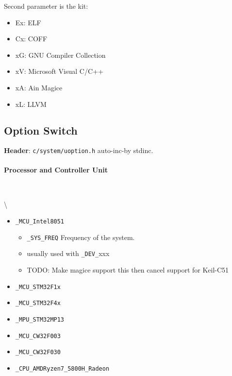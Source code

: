 Second parameter is the kit:

\begin{itemize}

\item Ex: ELF
\item Cx: COFF
\item xG: GNU Compiler Collection
\item xV: Microsoft Visual C/C++
\item xA: Ain Magice
\item xL: LLVM
\end{itemize}



\subsection{Option Switch}

\textbf{Header}: \verb|c/system/uoption.h| auto-inc-by stdinc.



\paragraph{Processor and Controller Unit} \

 \textbackslash{}

\begin{itemize}

\item \verb|_MCU_Intel8051|

\begin{itemize}

\item \verb|_SYS_FREQ| Frequency of the system.
\item usually used with \verb|_DEV_|xxx
\item TODO: Make magice support this then cancel support for Keil-C51
\end{itemize}



\item \verb|_MCU_STM32F1x|
\item \verb|_MCU_STM32F4x|
\item \verb|_MPU_STM32MP13|
\item \verb|_MCU_CW32F003|
\item \verb|_MCU_CW32F030|
\item \verb|_CPU_AMDRyzen7_5800H_Radeon|
\end{itemize}



